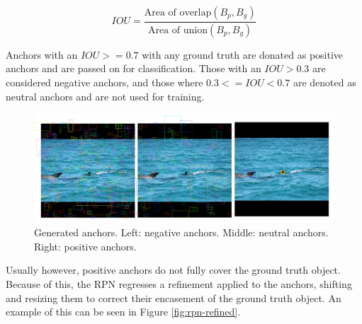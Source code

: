 \begin{equation}
IOU = \frac{\text{Area of overlap}(B_p, B_g)}{\text{Area of union}(B_p, B_g)}
\end{equation}

Anchors with an $IOU >= 0.7$ with any ground truth are donated as positive anchors and are passed on for classification. Those with an $IOU > 0.3$ are considered negative anchors, and those where $0.3 <= IOU < 0.7$ are denoted as neutral anchors and are not used for training. 

\begin{figure}
	\begin{center}
		\includegraphics[scale=0.25]{Chapter2/figs/anchor-types.png}
	\end{center}
	\caption{Generated anchors. Left: negative anchors. Middle: neutral anchors. Right: positive anchors.}
	\label{fig:anchor-types}
\end{figure}

Usually however, positive anchors do not fully cover the ground truth object. Because of this, the RPN regresses a refinement applied to the anchors, shifting and resizing them to correct their encasement of the ground truth object. An example of this can be seen in Figure \ref{fig:rpn-refined}.

